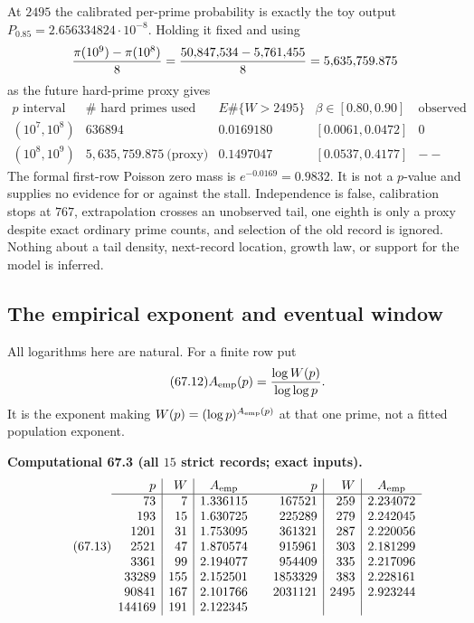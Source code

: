 \documentclass[10pt,reqno]{amsart}
\theoremstyle{definition}
\newcommand{\1}{\mathbf 1}
\begin{document}
At $2495$ the calibrated per-prime probability is exactly the toy output
$P_{0.85}=2.656334824\cdot10^{-8}$.  Holding it fixed and using
\[
 {\pi(10^9)-\pi(10^8)\over8}
 ={50{,}847{,}534-5{,}761{,}455\over8}=5{,}635{,}759.875
\]
as the future hard-prime proxy gives
\begin{equation}\tag{67.11}
\begin{array}{c|c|c|c|c}
p\text{ interval}&\#\text{ hard primes used}&E\#\{W>2495\}&
 \beta\in[0.80,0.90]&\text{observed}\\ \hline
(10^7,10^8)&636894&0.0169180&[0.0061,0.0472]&0\\
(10^8,10^9)&5{,}635{,}759.875\ \text{(proxy)}&0.1497047&[0.0537,0.4177]&--
\end{array}
\end{equation}
The formal first-row Poisson zero mass is $e^{-0.0169}=0.9832$.  It is not a
$p$-value and supplies no evidence for or against the stall.  Independence
is false, calibration stops at $767$, extrapolation crosses an unobserved
tail, one eighth is only a proxy despite exact ordinary prime counts, and
selection of the old record is ignored.  Nothing about a tail density,
next-record location, growth law, or support for the model is inferred.

\subsection{The empirical exponent and eventual window}
All logarithms here are natural.  For a finite row put
\begin{equation}\tag{67.12}
                         A_{\rm emp}(p)={\log W(p)\over\log\log p}.
\end{equation}
It is the exponent making $W(p)=(\log p)^{A_{\rm emp}(p)}$ at that one
prime, not a fitted population exponent.

\medskip\noindent\textbf{Computational 67.3 (all $15$ strict records; exact
inputs).}
\begin{equation}\tag{67.13}
\begin{array}{r|r|c@{\qquad}r|r|c}
p&W&A_{\rm emp}&p&W&A_{\rm emp}\\ \hline
73&7&1.336115&167521&259&2.234072\\
193&15&1.630725&225289&279&2.242045\\
1201&31&1.753095&361321&287&2.220056\\
2521&47&1.870574&915961&303&2.181299\\
3361&99&2.194077&954409&335&2.217096\\
33289&155&2.152501&1853329&383&2.228161\\
90841&167&2.101766&2031121&2495&2.923244\\
144169&191&2.122345&&&
\end{array}
\end{equation}
\end{document}
